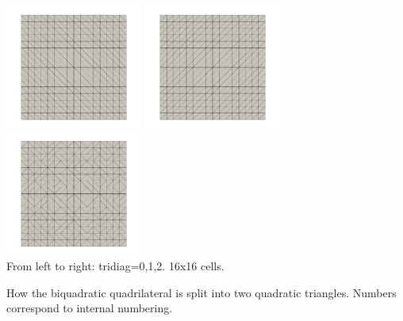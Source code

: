 \begin{center}
\includegraphics[width=4.5cm]{python_codes/fieldstone_112/results/exp5_tridiag/tridiag0}
\includegraphics[width=4.5cm]{python_codes/fieldstone_112/results/exp5_tridiag/tridiag1}
\includegraphics[width=4.5cm]{python_codes/fieldstone_112/results/exp5_tridiag/tridiag2}\\
{\captionfont From left to right: tridiag=0,1,2. 16x16 cells.}
\end{center}

\begin{center}

{\captionfont How the biquadratic quadrilateral is split into two quadratic triangles. 
Numbers correspond to internal numbering.}
\end{center}

\vspace{1cm}

